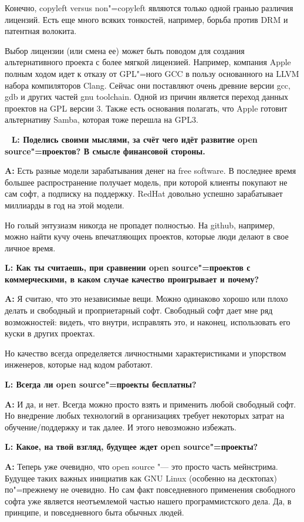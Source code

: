 \documentclass[10pt, a5paper]{article}
\begin{document}
Конечно, copyleft versus non"=copyleft являются только одной гранью различия лицензий. Есть еще много всяких тонкостей, например, борьба против DRM и патентная волокита.

Выбор лицензии (или смена ее) может быть поводом для создания альтернативного проекта с более мягкой лицензией. Например, компания Apple полным ходом идет к отказу от GPL"=ного GCC в пользу основанного на LLVM набора компиляторов Clang. Сейчас они поставляют очень древние версии gcc, gdb и других частей gnu toolchain. Одной из причин является переход данных проектов на GPL версии 3. Также есть основания полагать, что Apple готовит альтернативу Samba, которая тоже перешла на GPL3.

 
{\noindent \bf L:  Поделись своими мыслями, за счёт чего идёт развитие open source"=проектов? В смысле финансовой стороны.}

{\noindent \bf A:} Есть разные модели зарабатывания денег на free software. В последнее время большее распространение получает модель, при которой клиенты покупают не сам софт, а подписку на поддержку. RedHat довольно успешно зарабатывает миллиарды в год на этой модели.

Но голый энтузиазм никогда не пропадет полностью. На github, например, можно найти кучу очень впечатляющих проектов, которые люди делают в свое личное время.


{\noindent \bf L:  Как ты считаешь, при сравнении open source"=проектов с коммерческими, в каком случае качество проигрывает и почему?}

{\noindent \bf A:} Я считаю, что это независимые вещи. Можно одинаково хорошо или плохо делать и свободный и проприетарный софт. Свободный софт дает мне ряд возможностей: видеть, что внутри, исправлять это, и наконец, использовать его куски в других проектах. 

Но качество всегда определяется личностными характеристиками и упорством инженеров, которые над кодом работают.

{\noindent \bf L:  Всегда ли open source"=проекты бесплатны?}

{\noindent \bf A:} И да, и нет. Всегда можно просто взять и применить любой свободный софт. Но внедрение любых технологий в организациях требует некоторых затрат на обучение/поддержку и так далее. И этого невозможно избежать.


{\noindent \bf L:  Какое, на твой взгляд, будущее ждет open source"=проекты?}

{\noindent \bf A:} Теперь уже очевидно, что open source "--- это просто часть мейнстрима. Будущее таких важных инициатив как GNU Linux (особенно на десктопах) по"=прежнему не очевидно. Но сам факт повседневного применения свободного софта уже является неотъемлемой частью нашего программистского дела. Да, в принципе, и повседневного быта обычных людей.
\end{document}
